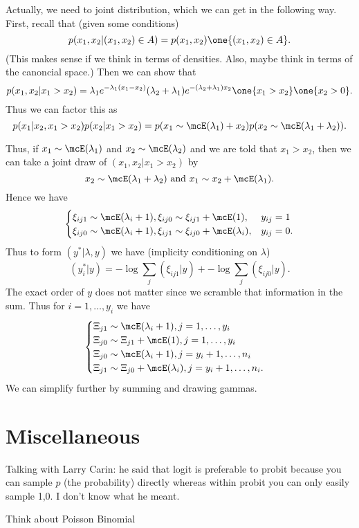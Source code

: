 \documentclass{article}
\begin{document}
Actually, we need to joint distribution, which we can get in the following way.
First, recall that (given some conditions)
\[
p(x_1, x_2 | (x_1, x_2) \in A) = p(x_1, x_2) \one \{ (x_1, x_2) \in A \}.
\]
(This makes sense if we think in terms of densities.  Also, maybe think in terms
of the canoncial space.)  Then we can show that
\[
p(x_1, x_2 | x_1 > x_2) = \lambda_1 e^{- \lambda_1 (x_1 - x_2)} 
(\lambda_2 + \lambda_1) e^{-(\lambda_2 + \lambda_1) x_2} \one \{x_1 > x_2\} \one
\{x_2 > 0 \}.
\]
Thus we can factor this as
\[
p(x_1 | x_2, x_1 > x_2) p(x_2 | x_1 > x_2) = p(x_1 \sim \mcE(\lambda_1) + x_2)
p(x_2 \sim \mcE(\lambda_1 + \lambda_2)).
\]

Thus, if $x_1 \sim \mcE(\lambda_1)$ and $x_2 \sim \mcE(\lambda_2)$ and we are
told that $x_1 > x_2$, then we can take a joint draw of $(x_1, x_2 | x_1 > x_2)$
by
\[
x_2 \sim \mcE(\lambda_1 + \lambda_2) \text{ and } 
x_1 \sim x_2 + \mcE(\lambda_1).
\]
Hence we have
\[
\begin{cases}
\xi_{ij1} \sim \mcE(\lambda_i + 1), \xi_{ij0} \sim \xi_{ij1} + \mcE(1), & y_{ij} =
1 \\
\xi_{ij0} \sim \mcE(\lambda_i + 1), \xi_{ij1} \sim \xi_{ij0} + \mcE(\lambda_i), &
y_{ij} = 0.
\end{cases}
\]
Thus to form $(y^*|\lambda,y)$ we have (implicity conditioning on $\lambda$)
\[
(y_{i}^* | y) = - \log \sum_{j} (\xi_{ij1}|y) + -\log \sum_{j} (\xi_{ij0}|y).
\]
The exact order of $y$ does not matter since we scramble that information in the
sum.  Thus for $i =1, \ldots, y_i$ we have
\[
\begin{cases}
\Xi_{j1} \sim \mcE(\lambda_i+1), j=1, \ldots, y_i \\
\Xi_{j0} \sim \Xi_{j1} + \mcE(1), j=1, \ldots, y_i \\
\Xi_{j0} \sim \mcE(\lambda_i+1), j=y_i+1, \ldots, n_i \\
\Xi_{j1} \sim \Xi_{j0} + \mcE(\lambda_i), j=y_i+1, \ldots, n_i.
\end{cases}
\]
We can simplify further by summing and drawing gammas.

\section{Miscellaneous}

\begin{outline}

\1 Talking with Larry Carin: he said that logit is preferable to probit because
you can sample $p$ (the probability) directly whereas within probit you can only
easily sample 1,0.  I don't know what he meant.

\1 Think about Poisson Binomial

\end{outline}
\end{document}
